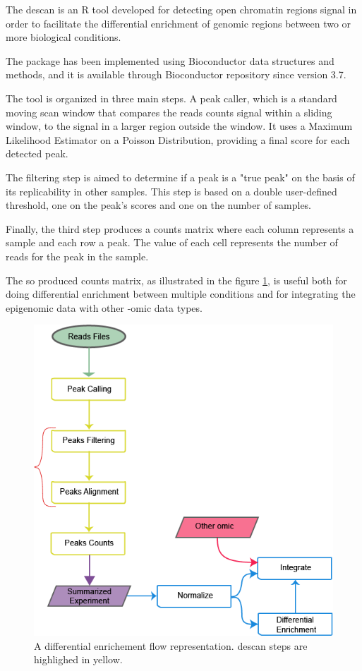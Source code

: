 The \gls{descan} is an R \cite{Ihaka1996} tool developed for detecting open chromatin regions signal in order to facilitate the differential enrichment of genomic regions between two or more biological conditions.

The package has been implemented using Bioconductor \cite{Gentleman2004} data structures and methods, and it is available through Bioconductor repository since version 3.7.

The tool is organized in three main steps. 
A peak caller, which is a standard moving scan window that compares the reads counts signal within a sliding window, to the signal in a larger region outside the window. It uses a Maximum Likelihood Estimator on a Poisson Distribution, providing a final score for each detected peak.

The filtering step is aimed to determine if a peak is a "true peak" on the basis of its replicability in other samples. This step is based on a double user-defined threshold, one on the peak's scores and one on the number of samples.

Finally, the third step produces a counts matrix where each column represents a sample and each row a peak. The value of each cell represents the number of reads for the peak in the sample.

The so produced counts matrix, as illustrated in the figure \ref{fig:descan2flow}, is useful both for doing differential enrichment between multiple conditions and for integrating the epigenomic data with other -omic data types.


\begin{figure}[H]
\centering
\includegraphics[width=\textwidth,height=\textheight,keepaspectratio]{img/descan2/flow.png}
\caption[DEScan2 workflow]{A differential enrichement flow representation. \gls{descan} steps are highlighed in yellow.}
\label{fig:descan2flow}
\end{figure}


